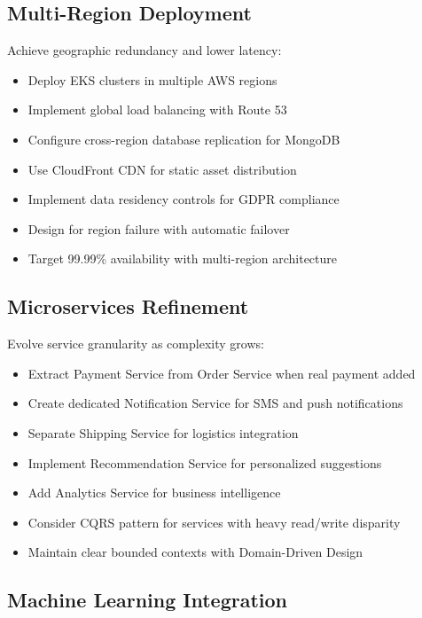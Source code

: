 \subsection{Multi-Region Deployment}

Achieve geographic redundancy and lower latency:
\begin{itemize}
    \item Deploy EKS clusters in multiple AWS regions
    \item Implement global load balancing with Route 53
    \item Configure cross-region database replication for MongoDB
    \item Use CloudFront CDN for static asset distribution
    \item Implement data residency controls for GDPR compliance
    \item Design for region failure with automatic failover
    \item Target 99.99\% availability with multi-region architecture
\end{itemize}

\subsection{Microservices Refinement}

Evolve service granularity as complexity grows:
\begin{itemize}
    \item Extract Payment Service from Order Service when real payment added
    \item Create dedicated Notification Service for SMS and push notifications
    \item Separate Shipping Service for logistics integration
    \item Implement Recommendation Service for personalized suggestions
    \item Add Analytics Service for business intelligence
    \item Consider CQRS pattern for services with heavy read/write disparity
    \item Maintain clear bounded contexts with Domain-Driven Design
\end{itemize}

\subsection{Machine Learning Integration}

